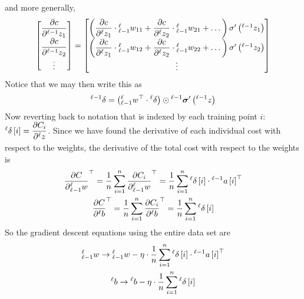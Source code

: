 \documentclass[11pt]{report} %
\begin{document}
and more generally,
\begin{equation}
\begin{bmatrix}\dfrac{\partial c}{\partial\mathstrut^{\ell-1}z_{1}}\\
\dfrac{\partial c}{\partial\mathstrut^{\ell-1}z_{2}}\\
\vdots
\end{bmatrix}=\begin{bmatrix}\left(\dfrac{\partial c}{\partial\mathstrut^{\ell}z_{1}}\cdot\mathstrut_{\ell-1}^{\ell}w_{11}+\dfrac{\partial c}{\partial\mathstrut^{\ell}z_{2}}\cdot\mathstrut_{\ell-1}^{\ell}w_{21}+\dots\right)\sigma'\left(\mathstrut^{\ell-1}z_{1}\right)\\
\left(\dfrac{\partial c}{\partial\mathstrut^{\ell}z_{1}}\cdot\mathstrut_{\ell-1}^{\ell}w_{12}+\dfrac{\partial c}{\partial\mathstrut^{\ell}z_{2}}\cdot\mathstrut_{\ell-1}^{\ell}w_{22}+\dots\right)\sigma'\left(\mathstrut^{\ell-1}z_{2}\right)\\
\vdots
\end{bmatrix}
\end{equation}
Notice that we may then write this as
\begin{equation}
\mathstrut^{\ell-1}\delta=\left(\mathstrut_{\ell-1}^{\ell}w^{\top}\cdot\mathstrut^{\ell}\delta\right)\odot\mathstrut^{\ell-1}\boldsymbol{\sigma}'\left(\mathstrut^{\ell-1}z\right)
\end{equation}
Now reverting back to notation that is indexed by each training point $i$: $\mathstrut^{\ell}\delta\left[i\right]=\dfrac{\partial C_{i}}{\partial\mathstrut^{\ell}z}$. Since we have found the derivative of each individual cost with respect to the weights, the derivative of the total cost with respect to the weights is
\begin{gather}
\dfrac{\partial C}{\partial\mathstrut_{\ell-1}^{\ell}w}^{\top} = \dfrac{1}{n}\sum_{i=1}^{n}\dfrac{\partial C_{i}}{\partial\mathstrut_{\ell-1}^{\ell}w}^{\top} = \dfrac{1}{n}\sum_{i=1}^{n}\mathstrut^{\ell}\delta\left[i\right]\cdot\mathstrut^{\ell-1}a\left[i\right]^{\top} \\
\dfrac{\partial C}{\partial\mathstrut^{\ell}b}^{\top}= \dfrac{1}{n}\sum_{i=1}^{n}\dfrac{\partial C_{i}}{\partial\mathstrut^{\ell}b}^{\top} = \dfrac{1}{n}\sum_{i=1}^{n}\mathstrut^{\ell}\delta\left[i\right]
\end{gather}
So the gradient descent equations using the entire data set are
\begin{gather}
\mathstrut_{\ell-1}^{\ell}w\rightarrow\mathstrut_{\ell-1}^{\ell}w-\eta\cdot\dfrac{1}{n}\sum_{i=1}^{n}\mathstrut^{\ell}\delta\left[i\right]\cdot\mathstrut^{\ell-1}a\left[i\right]^{\top} \\
\mathstrut^{\ell}b\rightarrow\mathstrut^{\ell}b-\eta\cdot\dfrac{1}{n}\sum_{i=1}^{n}\mathstrut^{\ell}\delta\left[i\right]
\end{gather}
\end{document}
